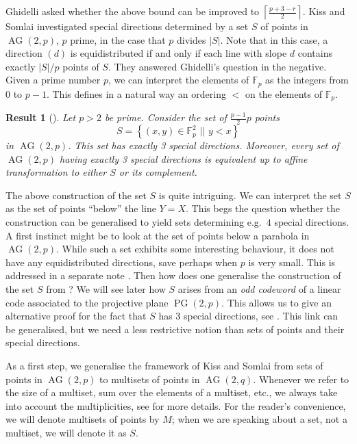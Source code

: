 \documentclass[12pt, a4paper]{article}
\newtheorem{res}[thm]{Result}
\theoremstyle{definition}
\newcommand{\FF}{\mathbb F}
\newcommand{\sett}[2]{ \left\{ #1 \, \, || \, \, #2 \right \} }
\newcommand{\ceil}[1]{\left \lceil #1 \right \rceil}
\DeclareMathOperator{\PG}{PG}
\newcommand{\pg}{\PG}
\DeclareMathOperator{\AG}{AG}
\newcommand{\ag}{\AG}
\begin{document}
Ghidelli \cite[Problem 1.4]{Ghidelli} asked whether the above bound can be improved to $\ceil{\frac{p+3-r}2}$.
Kiss and Somlai \cite{Kiss:Somlai} investigated special directions determined by a set $S$ of points in $\ag(2,p)$, $p$ prime, in the case that $p$ divides $|S|$.
Note that in this case, a direction $(d)$ is equidistributed if and only if each line with slope $d$ contains exactly $|S|/p$ points of $S$.
They answered Ghidelli's question in the negative.
Given a prime number $p$, we can interpret the elements of $\FF_p$ as the integers from $0$ to $p-1$.
This defines in a natural way an ordering $<$ on the elements of $\FF_p$.

\begin{res}[{\cite[Theorem 1.1]{Kiss:Somlai}}]
 \label{Res:KissSomlai}
 Let $p > 2$ be prime.
 Consider the set of $\frac{p-1}2 p$ points
 \[
  S = \sett{ (x,y) \in \FF_p^2 }{ y < x }
 \]
 in $\ag(2,p)$.
 This set has exactly 3 special directions.
 Moreover, every set of $\ag(2,p)$ having exactly 3 special directions is equivalent up to affine transformation to either $S$ or its complement.
\end{res}

The above construction of the set $S$ is quite intriguing.
We can interpret the set $S$ as the set of points ``below'' the line $Y = X$.
This begs the question whether the construction can be generalised to yield sets determining e.g.\ $4$ special directions.
A first instinct might be to look at the set of points below a parabola in $\ag(2,p)$.
While such a set exhibits some interesting behaviour, it does not have any equidistributed directions, save perhaps when $p$ is very small.
This is addressed in a separate note \cite{Parabola}.
Then how does one generalise the construction of the set $S$ from ?
We will see later how $S$ arises from an \emph{odd codeword} of a linear code associated to the projective plane $\pg(2,p)$.
This allows us to give an alternative proof for the fact that $S$ has 3 special directions, see .
This link can be generalised, but we need a less restrictive notion than sets of points and their special directions.

As a first step, we generalise the framework of Kiss and Somlai \cite{Kiss:Somlai} from sets of points in $\ag(2,p)$ to multisets of points in $\ag(2,q)$.
Whenever we refer to the size of a multiset, sum over the elements of a multiset, etc., we always take into account the multiplicities, see  for more details.
For the reader's convenience, we will denote multisets of points by $M$;
when we are speaking about a set, not a multiset, we will denote it as $S$.
\end{document}
